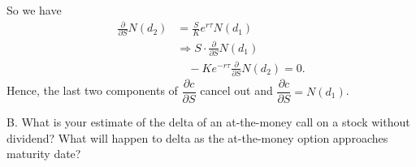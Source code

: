 \begin{solution}
So we have
\[
\begin{aligned}
\frac{\partial}{\partial S}N(d_2)&=\frac{S}{K}e^{r\tau}N(d_1)\\
&\Rightarrow S\cdot\frac{\partial}{\partial S}N(d_1)\\
&\quad-Ke^{-r\tau}\frac{\partial}{\partial S}N(d_2)=0.
\end{aligned}
\]
Hence, the last two components of $\dfrac{\partial c}{\partial S}$ cancel out and
$\dfrac{\partial c}{\partial S}=N(d_1)$.

\end{solution}

\begin{problem}{B. What is your estimate of the delta of an at-the-money call on a stock without dividend? What will happen to delta as the at-the-money option approaches maturity date?}
\end{problem}


